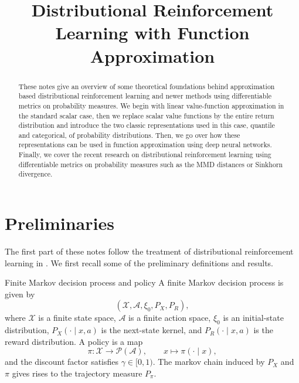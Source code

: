 \documentclass[12pt]{article}
\title{Distributional Reinforcement Learning with Function Approximation}
\author{ }
\date{}
\makeatletter
\newcommand{\mathleft}{\@fleqntrue\@mathmargin10pt}
\newcommand{\p}{\mathcal{P}}
\newcommand{\1}{\mathds{1}}
\newcommand{\X}{\mathcal{X}}
\newcommand{\A}{\mathcal{A}}
\makeatother
\begin{document}
\maketitle

\begin{abstract}
These notes give an overview of some theoretical foundations behind approximation based distributional
reinforcement learning and newer methods using differentiable metrics on probability measures. 
We begin with linear value-function approximation in the standard scalar case, then we replace
scalar value functions by the entire return distribution and introduce the two classic representations used in this case, quantile and categorical, of probability distributions.
Then, we go over how these representations can be used in function approximation using deep neural networks.
Finally, we cover the recent research on distributional reinforcement learning using differentiable metrics on probability measures such as the MMD distances or Sinkhorn divergence.  
\end{abstract}

\newlength\breite
\setlength\breite{\linewidth-4pt}
\setlength\fboxsep{0pt}
\setlength\fboxrule{0.25pt}
\setlength{\abovedisplayskip}{3mm} %
\setlength{\belowdisplayskip}{3mm} %
\setlength\itemsep{0pt}
\setlength\parindent{0pt}


\mathleft

\section*{Preliminaries}

The first part of these notes follow the treatment of distributional reinforcement learning
in \cite{bellemare2023distributional}. We first recall some of the preliminary definitions and results.

\begin{definition}{Finite Markov decision process and policy}{}
A finite Markov decision process is given by
$$
  (\X,\A,\xi_0,P_X,P_R),
$$
where $\X$ is a finite state space, $\A$ is a finite action space, $\xi_0$ is an
initial-state distribution, $P_X(\cdot\mid x,a)$ is the next-state kernel, and
$P_R(\cdot\mid x,a)$ is the reward distribution. A policy is a map
$$
  \pi:\X\to\p(\A),
  \qquad
  x\mapsto\pi(\cdot\mid x),
$$
and the discount factor satisfies $\gamma\in[0,1)$. The markov chain induced by $P_X$ and $\pi$ gives rises to the trajectory measure $P_\pi$.
\end{definition}
\end{document}

